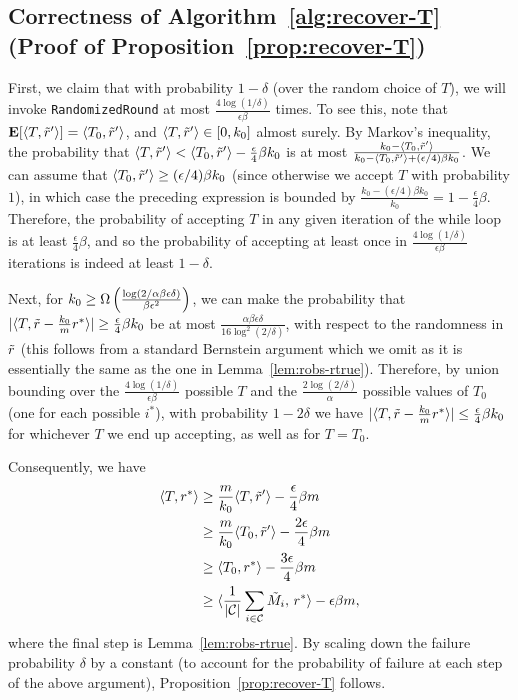\subsection{Correctness of Algorithm~\ref{alg:recover-T} (Proof of Proposition~\ref{prop:recover-T})}
\label{sec:recover-T-proof}

First, we claim that with probability $1-\delta$ (over the random choice of $T$), we will invoke 
\texttt{RandomizedRound} at most $\frac{4\log(1/\delta)}{\epsilon\beta}$ times. 
To see this, note that $\mathbf{E}[\langle T, \tilde{r}' \rangle] = \langle T_0, \tilde{r}' \rangle$, and 
$\langle T, \tilde{r}' \rangle \in [0, k_0]$ almost surely. 
By Markov's inequality, the probability that 
$\langle T, \tilde{r}' \rangle < \langle T_0, \tilde{r}' \rangle - \frac{\epsilon}{4}\beta k_0$ is at most $\frac{k_0 - \langle T_0, \tilde{r}' \rangle}{k_0 - \langle T_0, \tilde{r}' \rangle + (\epsilon/4)\beta k_0}$. We can assume that 
$\langle T_0, \tilde{r}' \rangle \geq (\epsilon/4)\beta k_0$ (since otherwise 
we accept $T$ with probability $1$), in which case the preceding expression 
is bounded by 
$\frac{k_0 - (\epsilon/4)\beta k_0}{k_0} = 1 - \frac{\epsilon}{4}\beta$. 
Therefore, the probability of accepting $T$ in any given iteration of the while 
loop is at least $\frac{\epsilon}{4}\beta$, and so the probability of 
accepting at least once in $\frac{4\log(1/\delta)}{\epsilon\beta}$ iterations is 
indeed at least $1 - \delta$.

Next, for $k_0 \geq \Omega\left( \frac{\log(2/\alpha\beta\epsilon\delta)}{\beta \epsilon^2} \right)$, 
we can make the probability that $|\langle T, \tilde{r} - \frac{k_0}{m}r^* \rangle| \geq \frac{\epsilon}{4} \beta k_0$ be at most $\frac{\alpha\beta\epsilon\delta}{16\log^2(2/\delta)}$, with 
respect to the randomness in $\tilde{r}$ (this follows from a standard Bernstein argument which we omit as it is essentially the same as the one 
in Lemma~\ref{lem:robs-rtrue}). 
Therefore, by union bounding over the $\frac{4\log(1/\delta)}{\epsilon\beta}$ 
possible $T$ and the $\frac{2\log(2/\delta)}{\alpha}$ possible values of $T_0$ (one for each possible $i^*$), 
with probability $1-2\delta$ we have $|\langle T, \tilde{r} - \frac{k_0}{m} r^* \rangle| \leq \frac{\epsilon}{4}\beta k_0$ for whichever $T$ we end up accepting, as well as for $T = T_0$.

Consequently, we have
\begin{align}
\langle T, r^* \rangle &\geq \frac{m}{k_0} \langle T, \tilde{r}' \rangle - \frac{\epsilon}{4}\beta m \\
 &\geq \frac{m}{k_0} \langle T_0, \tilde{r}' \rangle - \frac{2\epsilon}{4}\beta m \\
 &\geq \langle T_0, r^* \rangle - \frac{3\epsilon}{4}\beta m \\
 &\geq \langle \frac{1}{|\mathcal{C}|} \sum_{i \in \mathcal{C}} \tilde{M}_i,\, r^* \rangle - \epsilon\beta m,
\end{align}
where the final step is Lemma~\ref{lem:robs-rtrue}.
By scaling down the failure probability $\delta$ by a constant 
(to account for the probability of failure at each step of the above argument), 
Proposition~\ref{prop:recover-T} follows.
